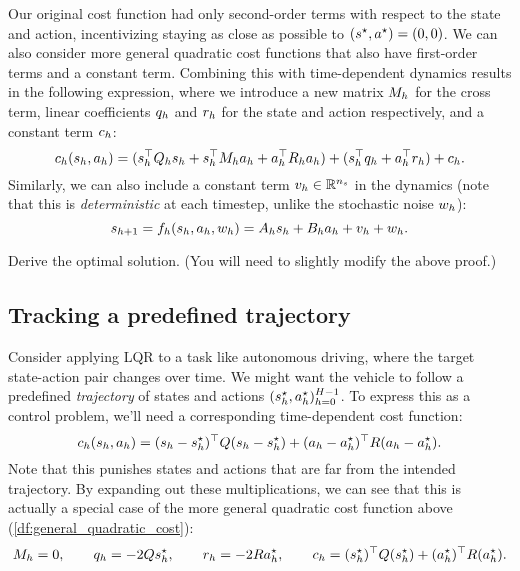 \documentclass[\main/main]{subfiles}
\begin{document}
Our original cost function had only second-order terms with respect to the state and action, incentivizing staying as close as possible to $(s^\star, a^\star) = (0, 0)$. We can also consider more general quadratic cost functions that also have first-order terms and a constant term.
Combining this with time-dependent dynamics results in the following expression, where we introduce a new matrix $M_h$ for the cross term, linear coefficients $q_h$ and $r_h$ for the state and action respectively, and a constant term $c_h$:
\begin{equation}
    c_h(s_h, a_h) = ( s_h^\top Q_h s_h + s_h^\top M_h a_h + a_h^\top R_h a_h ) + (s_h^\top q_h + a_h^\top r_h) + c_h.
    \label{df:general_quadratic_cost}
\end{equation}
Similarly, we can also include a constant term $v_h \in \mathbb{R}^{n_s}$ in the dynamics (note that this is \emph{deterministic} at each timestep, unlike the stochastic noise $w_h$):
\[
    s_{h+1} = f_h(s_h, a_h, w_h) = A_h s_h + B_h a_h + v_h + w_h.
\]
\begin{exercise}
    Derive the optimal solution. (You will need to slightly modify the above proof.)
\end{exercise}

\subsection{Tracking a predefined trajectory}

Consider applying LQR to a task like autonomous driving, where the target state-action pair changes over time.
We might want the vehicle to follow a predefined \emph{trajectory} of
states and actions $(s_h^\star, a_h^\star)_{h=0}^{H-1}$. To express this as a control problem, we'll need a corresponding time-dependent cost function:
\[
    c_h(s_h, a_h) = (s_h - s^\star_h)^\top Q (s_h - s^\star_h) + (a_h - a^\star_h)^\top R (a_h - a^\star_h).
\]
Note that this punishes states and actions that are far from the intended trajectory. By expanding out these multiplications, we can see that this is actually a special case of the more general quadratic cost function above (\autoref{df:general_quadratic_cost}): \[
    M_h = 0, \qquad q_h = -2Q s^\star_h, \qquad r_h = -2R a^\star_h, \qquad c_h = (s^\star_h)^\top Q (s^\star_h) + (a^\star_h)^\top R (a^\star_h).
\]
\end{document}
